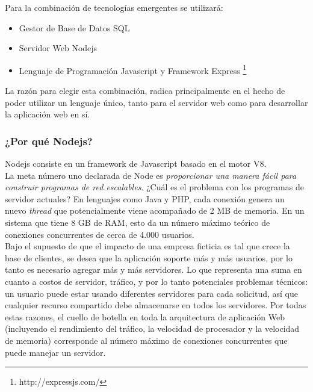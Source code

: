 Para la combinación de tecnologías emergentes se utilizará:

\begin{itemize}
 \item Gestor de Base de Datos SQL
 \item Servidor Web Nodejs
 \item Lenguaje de Programación Javascript y Framework Express \footnote{http://expressjs.com/}
\end{itemize}

La razón para elegir esta combinación, radica principalmente en el hecho de poder utilizar
un lenguaje único, tanto para el servidor web como para desarrollar la aplicación web en sí.\\




\subsubsection{¿Por qué Nodejs?}

Nodejs consiste en un framework de Javascript basado en el motor V8.\\

La meta número uno declarada de Node es \textit{proporcionar una manera fácil para construir 
programas de red escalables}. ¿Cuál es el problema con los programas de servidor actuales? 
En lenguajes como Java y PHP, cada conexión genera un nuevo \textit{thread} que potencialmente viene 
acompañado de 2 MB de memoria. En un sistema que tiene 8 GB de RAM, esto da un número máximo teórico 
de conexiones concurrentes de cerca de 4.000 usuarios.\\

Bajo el supuesto de que el impacto de una empresa ficticia es tal que crece la base de clientes, se desea 
que la aplicación soporte más y más usuarios, por lo tanto es necesario agregar más y más servidores.
Lo que representa una suma en cuanto a costos de servidor, tráfico, y por lo tanto potenciales
problemas técnicos: un usuario puede estar usando diferentes servidores para cada solicitud, así que cualquier 
recurso compartido debe almacenarse en todos los servidores. Por todas estas razones, el cuello de botella en 
toda la arquitectura de aplicación Web (incluyendo el rendimiento del tráfico, la velocidad de procesador y la 
velocidad de memoria) corresponde al número máximo de conexiones concurrentes que puede manejar un servidor.\\

